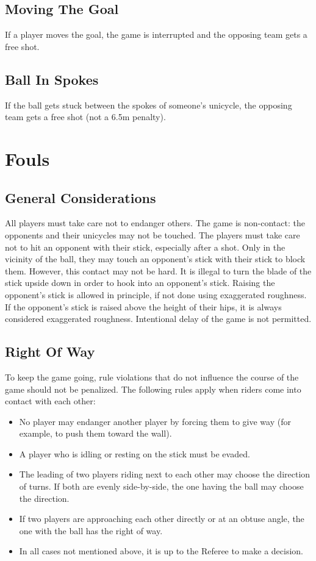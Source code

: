 \subsection{Moving The Goal}
If a player moves the goal, the game is interrupted and the opposing team gets a free shot.

\subsection{Ball In Spokes}
If the ball gets stuck between the spokes of someone's unicycle, the opposing team gets a free shot (not a 6.5m penalty).

\section{Fouls}

\subsection{General Considerations}
All players must take care not to endanger others.
The game is non-contact: the opponents and their unicycles may not be touched.
The players must take care not to hit an opponent with their stick, especially after a shot.
Only in the vicinity of the ball, they may touch an opponent's stick with their stick to block them.
However, this contact may not be hard.
It is illegal to turn the blade of the stick upside down in order to hook into an opponent's stick.
Raising the opponent's stick is allowed in principle, if not done using exaggerated roughness.
If the opponent's stick is raised above the height of their hips, it is always considered exaggerated roughness.
Intentional delay of the game is not permitted.

\subsection{Right Of Way}
To keep the game going, rule violations that do not influence the course of the game should not be penalized.
The following rules apply when riders come into contact with each other:
\begin{itemize}
\item No player may endanger another player by forcing them to give way (for example, to push them toward the wall).
\item A player who is idling or resting on the stick must be evaded.
\item The leading of two players riding next to each other may choose the direction of turns.
If both are evenly side-by-side, the one having the ball may choose the direction.
\item If two players are approaching each other directly or at an obtuse angle, the one with the ball has the right of way.
\item In all cases not mentioned above, it is up to the Referee to make a decision.
\end{itemize}

